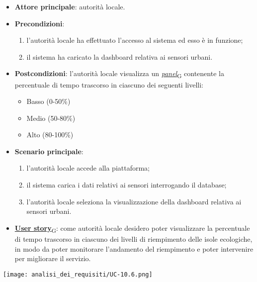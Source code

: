 \begin{itemize}
	\item \textbf{Attore principale}: autorità locale.
	\item \textbf{Precondizioni}:
	      \begin{enumerate}
		      \item l'autorità locale ha effettuato l'accesso al sistema ed esso è in funzione;
		      \item il sistema ha caricato la dashboard relativa ai sensori urbani.
	      \end{enumerate}
	\item \textbf{Postcondizioni}: l'autorità locale visualizza un \href{https://7last.github.io/docs/rtb/documentazione-interna/glossario\#panel}{\textit{panel}\textsubscript{G}} contenente la percentuale di tempo trascorso in ciascuno dei seguenti livelli:
	      \begin{itemize}
		      \item Basso (0-50\%)
		      \item Medio (50-80\%)
		      \item Alto (80-100\%)
	      \end{itemize}
	\item \textbf{Scenario principale}:
	      \begin{enumerate}
		      \item l'autorità locale accede alla piattaforma;
		      \item il sistema carica i dati relativi ai sensori interrogando il database;
		      \item l'autorità locale seleziona la visualizzazione della dashboard relativa ai sensori urbani.
	      \end{enumerate}
	\item \href{https://7last.github.io/docs/rtb/documentazione-interna/glossario\#user-story}{\textbf{User story}\textsubscript{G}}:
	      come autorità locale desidero poter visualizzare la percentuale di tempo trascorso in ciascuno dei livelli di riempimento delle isole ecologiche,
	      in modo da poter monitorare l'andamento del riempimento e poter intervenire per migliorare il servizio.
\end{itemize}
\begin{center}
	\texttt{[image: analisi\_dei\_requisiti/UC-10.6.png]}
\end{center}

